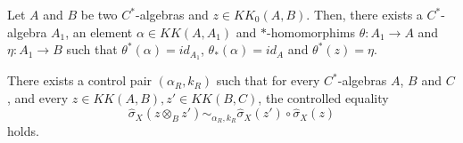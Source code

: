\begin{lem} Let $A$ and $B$ be two $C^*$-algebras and $z\in KK_0(A,B)$. Then, there exists a $C^*$-algebra $A_1$, an element $\alpha \in KK(A,A_1)$ and $*$-homomorphims $\theta : A_1 \rightarrow A$ and $\eta : A_1 \rightarrow B$ such that
$\theta^*(\alpha) = id_{A_1}$, $\theta_*(\alpha) = id_{A}$ and $\theta^*(z) = \eta$.
\end{lem}

\begin{prop} There exists a control pair $(\alpha_R,k_R)$ such that for every $C^*$-algebras $A$, $B$ and $C$, and every $z\in KK(A,B),z'\in KK(B,C)$, the controlled equality
\[\hat\sigma_X(z\otimes_B z') \sim_{\alpha_R,k_R} \hat\sigma_X(z')\circ \hat\sigma_X(z)\]
holds.
\end{prop}

